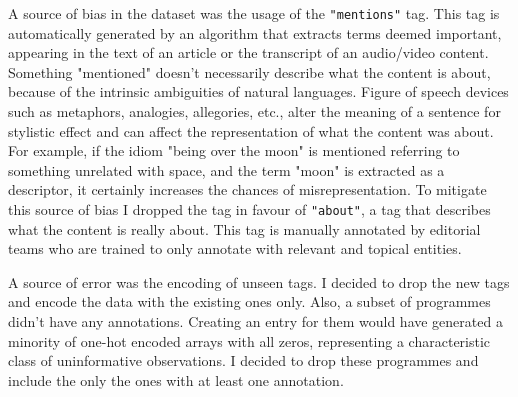A source of bias in the dataset was the usage of the \verb|"mentions"| tag. This tag is automatically generated by an algorithm that extracts
terms deemed important, appearing in the text of an article or the transcript of an audio/video content.
Something "mentioned" doesn't necessarily describe what the content is about, because of the intrinsic ambiguities of natural languages.
Figure of speech devices such as metaphors, analogies, allegories, etc., alter the meaning of a sentence for stylistic effect and can
affect the representation of what the content was about. For example, if the idiom "being over the moon" is mentioned referring to
something unrelated with space, and the term "moon" is extracted as a descriptor, it certainly increases the chances of misrepresentation.
To mitigate this source of bias I dropped the tag in favour of \verb|"about"|, a tag that describes what the content is really about.
This tag is manually annotated by editorial teams who are trained to only annotate with relevant and topical entities.

A source of error was the encoding of unseen tags. I decided to drop the new tags and encode the data with the existing ones only.
Also, a subset of programmes didn't have any annotations. Creating an entry for them would have generated a minority of one-hot encoded arrays
with all zeros, representing a characteristic class of uninformative observations. I decided to drop these programmes and include the only the ones
with at least one annotation.
